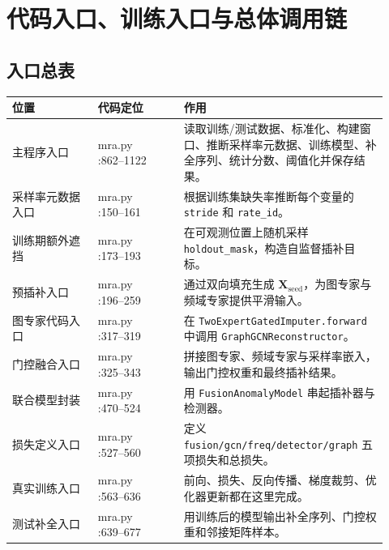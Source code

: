 \documentclass[UTF8]{ctexart}
\newcommand{\codecell}[1]{\parbox[t]{\linewidth}{\raggedright\ttfamily\small #1}}
\begin{document}
\section{代码入口、训练入口与总体调用链}

\subsection{入口总表}

{\small
\begin{longtable}{@{}>{\raggedright\arraybackslash}p{0.21\linewidth} >{\raggedright\arraybackslash}p{0.21\linewidth} >{\raggedright\arraybackslash}p{0.50\linewidth}@{}}
\toprule
位置 & 代码定位 & 作用 \\
\midrule
\endhead
主程序入口 & \codecell{mra.py\\:862--1122} & 读取训练/测试数据、标准化、构建窗口、推断采样率元数据、训练模型、补全序列、统计分数、阈值化并保存结果。 \\
采样率元数据入口 & \codecell{mra.py\\:150--161} & 根据训练集缺失率推断每个变量的 \texttt{stride} 和 \texttt{rate\_id}。 \\
训练期额外遮挡 & \codecell{mra.py\\:173--193} & 在可观测位置上随机采样 \texttt{holdout\_mask}，构造自监督插补目标。 \\
预插补入口 & \codecell{mra.py\\:196--259} & 通过双向填充生成 \(\bm{X}_{\text{seed}}\)，为图专家与频域专家提供平滑输入。 \\
图专家代码入口 & \codecell{mra.py\\:317--319} & 在 \texttt{TwoExpertGatedImputer.forward} 中调用 \texttt{GraphGCNReconstructor}。 \\
门控融合入口 & \codecell{mra.py\\:325--343} & 拼接图专家、频域专家与采样率嵌入，输出门控权重和最终插补结果。 \\
联合模型封装 & \codecell{mra.py\\:470--524} & 用 \texttt{FusionAnomalyModel} 串起插补器与检测器。 \\
损失定义入口 & \codecell{mra.py\\:527--560} & 定义 \texttt{fusion/gcn/freq/detector/graph} 五项损失和总损失。 \\
真实训练入口 & \codecell{mra.py\\:563--636} & 前向、损失、反向传播、梯度裁剪、优化器更新都在这里完成。 \\
测试补全入口 & \codecell{mra.py\\:639--677} & 用训练后的模型输出补全序列、门控权重和邻接矩阵样本。 \\

\end{longtable}}
\end{document}
